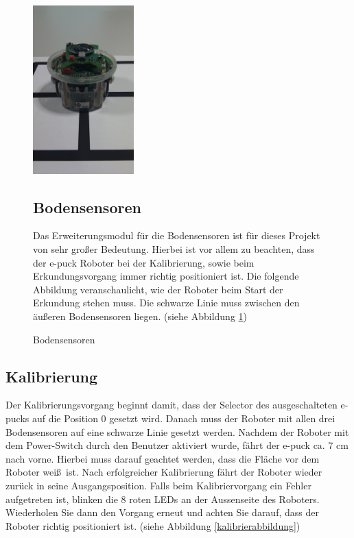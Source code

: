 \documentclass[10pt,a4paper]{article}
\begin{document}
    \begin{figure}[htbp]
		\begin{minipage}[t]{6.5cm}
			\vspace{0pt}
			\includegraphics[height=6.5cm]{images/puck2klein} 
			\caption{Bodensensoren}
			\label{positionierung_epuck}
		\end{minipage}
		\hfill
		\begin{minipage}[t]{0.5\textwidth}
			\vspace{10pt}
				\subsection{Bodensensoren}
						Das Erweiterungsmodul f\"ur die Bodensensoren ist f\"ur dieses Projekt von sehr gro\ss er Bedeutung. Hierbei ist vor allem zu beachten, dass der e-puck 								Roboter	bei der Kalibrierung, sowie beim Erkundungsvorgang immer richtig positioniert ist. Die folgende Abbildung veranschaulicht, wie der Roboter 
						beim Start der Erkundung	stehen muss. Die schwarze Linie muss zwischen den \"au\ss eren Bodensensoren liegen. (siehe Abbildung 				
						\ref{positionierung_epuck})
		\end{minipage}
   \end{figure}
   
\newpage

	\subsection{Kalibrierung}
		Der Kalibrierungsvorgang beginnt damit, dass der Selector des ausgeschalteten e-pucks auf die Position 0 gesetzt wird. Danach muss der Roboter mit allen drei
		Bodensensoren auf eine schwarze Linie gesetzt werden. Nachdem der Roboter mit dem Power-Switch durch den Benutzer aktiviert wurde, f\"ahrt der e-puck ca.
		7 cm nach vorne. Hierbei muss darauf geachtet werden, dass die Fl\"ache vor dem Roboter wei\ss \ ist. Nach erfolgreicher Kalibrierung f\"ahrt der Roboter wieder
		zur\"uck in seine Ausgangsposition. Falls beim Kalibriervorgang ein Fehler aufgetreten ist, blinken die 8 roten LEDs an der Aussenseite des Roboters. 
		Wiederholen Sie dann den Vorgang erneut und achten Sie darauf, dass der Roboter richtig positioniert ist. (siehe Abbildung \ref{kalibrierabbildung}) \\
		
\end{document}
